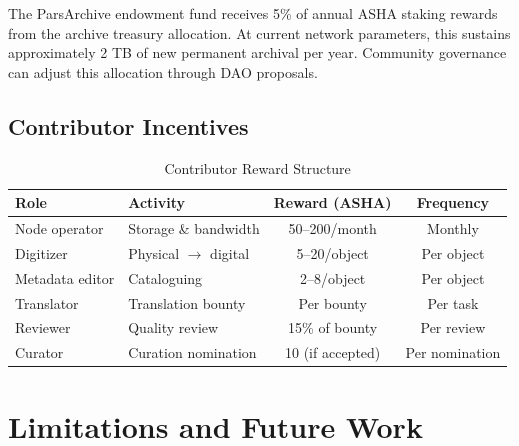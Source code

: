 \documentclass[11pt,a4paper]{article}
\begin{document}
The ParsArchive endowment fund receives 5\% of annual ASHA staking rewards from the archive treasury allocation. At current network parameters, this sustains approximately 2 TB of new permanent archival per year. Community governance can adjust this allocation through DAO proposals.

\subsection{Contributor Incentives}

\begin{table}[H]
\centering
\caption{Contributor Reward Structure}
\label{tab:rewards}
\begin{tabular}{llcc}
\toprule
\textbf{Role} & \textbf{Activity} & \textbf{Reward (ASHA)} & \textbf{Frequency} \\
\midrule
Node operator & Storage \& bandwidth & 50--200/month & Monthly \\
Digitizer & Physical $\rightarrow$ digital & 5--20/object & Per object \\
Metadata editor & Cataloguing & 2--8/object & Per object \\
Translator & Translation bounty & Per bounty & Per task \\
Reviewer & Quality review & 15\% of bounty & Per review \\
Curator & Curation nomination & 10 (if accepted) & Per nomination \\
\bottomrule
\end{tabular}
\end{table}

\section{Limitations and Future Work}
\end{document}
